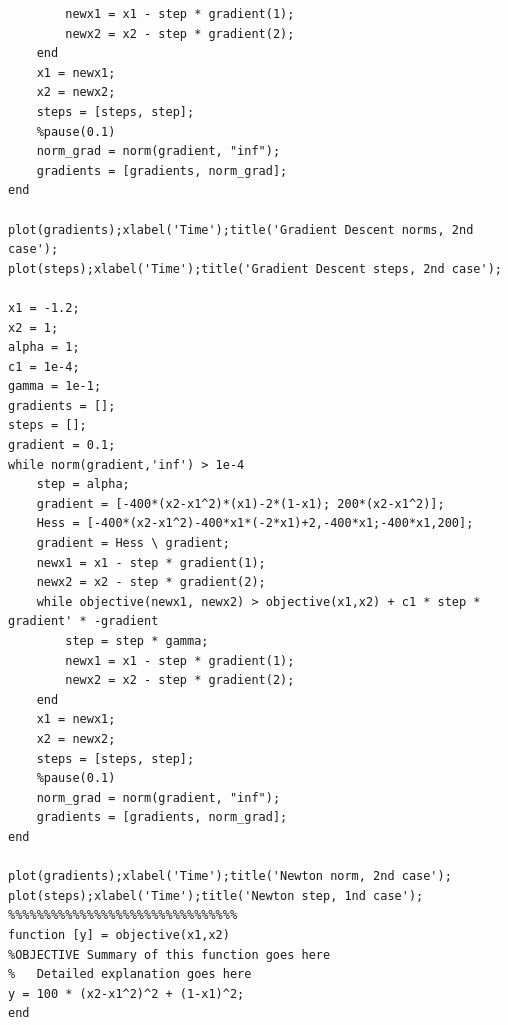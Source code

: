 \documentclass[10pt]{article}
\begin{document}
\begin{verbatim}
        newx1 = x1 - step * gradient(1);
        newx2 = x2 - step * gradient(2);
    end
    x1 = newx1;
    x2 = newx2;
    steps = [steps, step];
    %pause(0.1)
    norm_grad = norm(gradient, "inf");
    gradients = [gradients, norm_grad];
end

plot(gradients);xlabel('Time');title('Gradient Descent norms, 2nd case');
plot(steps);xlabel('Time');title('Gradient Descent steps, 2nd case');

x1 = -1.2;
x2 = 1;
alpha = 1;
c1 = 1e-4;
gamma = 1e-1;
gradients = [];
steps = [];
gradient = 0.1;
while norm(gradient,'inf') > 1e-4
    step = alpha;
    gradient = [-400*(x2-x1^2)*(x1)-2*(1-x1); 200*(x2-x1^2)];
    Hess = [-400*(x2-x1^2)-400*x1*(-2*x1)+2,-400*x1;-400*x1,200];
    gradient = Hess \ gradient;
    newx1 = x1 - step * gradient(1);
    newx2 = x2 - step * gradient(2);
    while objective(newx1, newx2) > objective(x1,x2) + c1 * step * gradient' * -gradient
        step = step * gamma;
        newx1 = x1 - step * gradient(1);
        newx2 = x2 - step * gradient(2);
    end
    x1 = newx1;
    x2 = newx2;
    steps = [steps, step];
    %pause(0.1)
    norm_grad = norm(gradient, "inf");
    gradients = [gradients, norm_grad];
end

plot(gradients);xlabel('Time');title('Newton norm, 2nd case');
plot(steps);xlabel('Time');title('Newton step, 1nd case');
%%%%%%%%%%%%%%%%%%%%%%%%%%%%%%%%
function [y] = objective(x1,x2)
%OBJECTIVE Summary of this function goes here
%   Detailed explanation goes here
y = 100 * (x2-x1^2)^2 + (1-x1)^2;
end
\end{verbatim}
\end{document}
